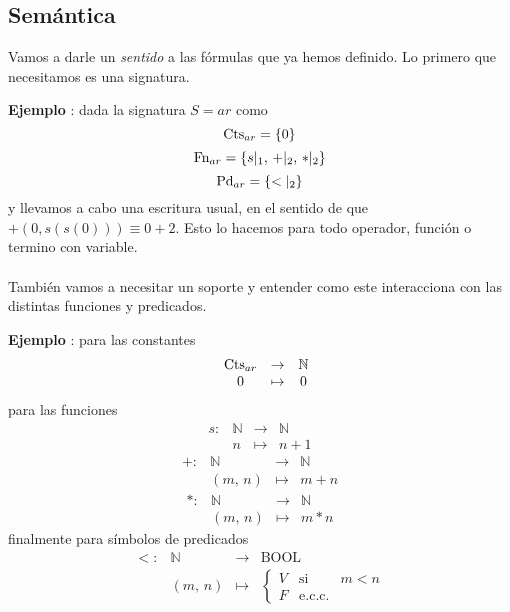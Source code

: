 \subsection{Semántica}
Vamos a darle un \textit{sentido} a las fórmulas que ya hemos definido. Lo primero que necesitamos es una signatura.

\addtocounter{ej}{1} %
\textbf{Ejemplo }: dada la signatura $S= \si{ar}$ como
\[ \mbox{Cts}_{ar}=\{0 \} \]
\[ \mbox{Fn}_{ar}=\{ s\vert_{1},\, +\vert_{2}, \, \ast\vert_{2}\} \]
\[ \mbox{Pd}_{ar}=\{ <\vert_{2} \} \]
y llevamos a cabo una escritura usual, en el sentido de que $+(0,s(s(0))) \equiv 0+2$. Esto lo hacemos para todo operador, función o termino con variable. 
\paragraph{}
También vamos a necesitar un soporte y entender como este interacciona con las distintas funciones y predicados.

\addtocounter{ej}{1} %
\textbf{Ejemplo }:
para las constantes 
\[ \begin{matrix}
&\mbox{Cts}_{ar}& \rightarrow & \mathbb{N}\\
&0&\mapsto& 0
\end{matrix} \]
para las funciones
\[ \begin{matrix}
s:&\mathbb{N}& \rightarrow & \mathbb{N}\\
&n&\mapsto& n+1
\end{matrix} \]
\[ \begin{matrix}
+:&\mathbb{N}& \rightarrow & \mathbb{N}\\
&(m,\,n)&\mapsto& m+n
\end{matrix} \] 
\[ \begin{matrix}
\ast : &\mathbb{N}& \rightarrow & \mathbb{N}\\
&(m, \, n)&\mapsto& m \ast n
\end{matrix} \]
finalmente para símbolos de predicados
\[ \begin{matrix}
<:&\mathbb{N}& \rightarrow & \mbox{BOOL}\\
&(m, \, n)&\mapsto& \left \lbrace \begin{matrix}
V & \mbox{si} & m<n\\
F & \mbox{e.c.c.} &
\end{matrix}\right.
\end{matrix} \] 

